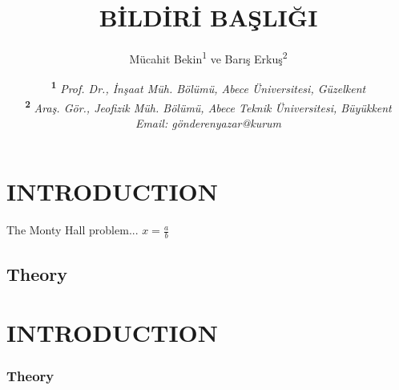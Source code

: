 \documentclass[turkish]{eqconf}
\title{BİLDİRİ BAŞLIĞI}
\author{%
		Mücahit Bekin\textsuperscript{1} ve
		Barış Erkuş\textsuperscript{2}%
}
\date{\small%
\textsuperscript{\textbf{1}}
\textit{Prof. Dr., İnşaat Müh. Bölümü, Abece Üniversitesi, Güzelkent}\\
\textsuperscript{\textbf{2}}
\textit{Araş. Gör., Jeofizik Müh. Bölümü, Abece Teknik Üniversitesi, 
Büyükkent}\\
\textit{Email: gönderenyazar@kurum}%
}
\begin{document}
\fixturkishbug
\maketitle
\thispagestyle{firststyle}

 
\begin{ozet}   %
\blindtext
\end{ozet}



\begin{abstract} %
\blindtext
\end{abstract}




 
\section{INTRODUCTION}
 
The Monty Hall problem...
$x=\frac{a}{b}$
 
\subsection{Theory}

\blindtext

\section{INTRODUCTION}

\blindtext

\subsubsection*{Theory}

\blindtext

\blindtext

\blindtext

\blindtext

\blindtext
\end{document}
